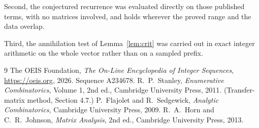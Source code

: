 \documentclass[11pt,a4paper]{article}
\theoremstyle{plain}
\theoremstyle{definition}
\begin{document}
Second, the conjectured recurrence was evaluated directly on those published terms, with no
matrices involved, and holds wherever the proved range and the data overlap.

Third, the annihilation test of Lemma~\ref{lem:crit} was carried out in exact integer
arithmetic on the whole vector rather than on a sampled prefix.

\begin{thebibliography}{9}
 The OEIS Foundation, \emph{The On-Line Encyclopedia of Integer
Sequences}, \url{https://oeis.org}, 2026. Sequence A234678.
 R.~P.~Stanley, \emph{Enumerative Combinatorics}, Volume 1, 2nd ed.,
Cambridge University Press, 2011. (Transfer-matrix method, Section 4.7.)
 P.~Flajolet and R.~Sedgewick, \emph{Analytic Combinatorics}, Cambridge
University Press, 2009.
 R.~A.~Horn and C.~R.~Johnson, \emph{Matrix Analysis}, 2nd ed., Cambridge
University Press, 2013.
\end{thebibliography}
\end{document}
